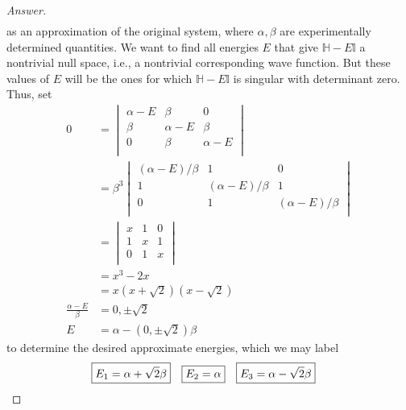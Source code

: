 \documentclass[../psets.tex]{subfiles}
\begin{document}
\begin{enumerate}
\begin{enumerate}
\begin{proof}[Answer]
\begin{align*}
            \end{align*}
            as an approximation of the original system, where $\alpha,\beta$ are experimentally determined quantities. We want to find all energies $E$ that give $\mathbb{H}-E\mathbb{I}$ a nontrivial null space, i.e., a nontrivial corresponding wave function. But these values of $E$ will be the ones for which $\mathbb{H}-E\mathbb{I}$ is singular with determinant zero. Thus, set
            \begingroup
            \allowdisplaybreaks
            \begin{align*}
                0 &=
                \begin{vmatrix}
                    \alpha-E & \beta & 0\\
                    \beta & \alpha-E & \beta\\
                    0 & \beta & \alpha-E\\
                \end{vmatrix}\\
                &= \beta^3
                \begin{vmatrix}
                    (\alpha-E)/\beta & 1 & 0\\
                    1 & (\alpha-E)/\beta & 1\\
                    0 & 1 & (\alpha-E)/\beta\\
                \end{vmatrix}\\
                &=
                \begin{vmatrix}
                    x & 1 & 0\\
                    1 & x & 1\\
                    0 & 1 & x\\
                \end{vmatrix}\\
                &= x^3-2x\\
                &= x(x+\sqrt{2})(x-\sqrt{2})\\
                \frac{\alpha-E}{\beta} &= 0,\pm\sqrt{2}\\
                E &= \alpha-(0,\pm\sqrt{2})\beta
            \end{align*}
            \endgroup
            to determine the desired approximate energies, which we may label
            \begin{align*}
                \Aboxed{E_1 &= \alpha+\sqrt{2}\beta}&
                \Aboxed{E_2 &= \alpha}&
                \Aboxed{E_3 &= \alpha-\sqrt{2}\beta}
            \end{align*}

\end{proof}
\end{enumerate}
\end{enumerate}
\end{document}
